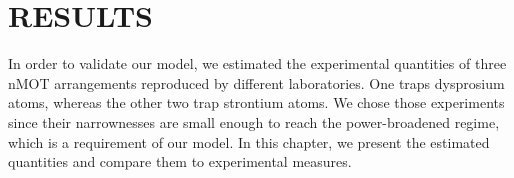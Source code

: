 %
\chapter{RESULTS}
\label{ch:results}
% 

In order to validate our model, we estimated the experimental quantities of three nMOT arrangements reproduced by different laboratories. One traps dysprosium atoms, whereas the other two trap strontium atoms. We chose those experiments since their narrownesses are small enough to reach the power-broadened regime, which is a requirement of our model. In this chapter, we present the estimated quantities and compare them to experimental measures.


%


%
